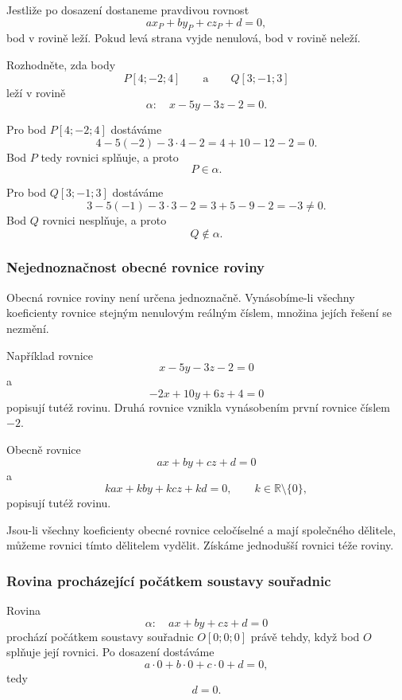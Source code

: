 Jestliže po dosazení dostaneme pravdivou rovnost
\[
    ax_P+by_P+cz_P+d=0,
\]
bod v rovině leží. Pokud levá strana vyjde nenulová, bod v rovině neleží.

\begin{example}
    \label{exa:Point_membership_general_plane}
    Rozhodněte, zda body
    \[
        P[4;-2;4]
        \qquad\text{a}\qquad
        Q[3;-1;3]
    \]
    leží v rovině
    \[
        \alpha:\quad x-5y-3z-2=0.
    \]

    Pro bod $P[4;-2;4]$ dostáváme
    \[
        4-5(-2)-3\cdot4-2
        =4+10-12-2
        =0.
    \]
    Bod $P$ tedy rovnici splňuje, a proto
    \[
        P\in\alpha.
    \]

    Pro bod $Q[3;-1;3]$ dostáváme
    \[
        3-5(-1)-3\cdot3-2
        =3+5-9-2
        =-3\neq0.
    \]
    Bod $Q$ rovnici nesplňuje, a proto
    \[
        Q\notin\alpha.
    \]
\end{example}

\subsubsection{Nejednoznačnost obecné rovnice roviny}
\label{subsubsec:Nonuniqueness_general_plane_equation}

Obecná rovnice roviny není určena jednoznačně. Vynásobíme-li všechny
koeficienty rovnice stejným nenulovým reálným číslem, množina jejích
řešení se nezmění.

Například rovnice
\[
    x-5y-3z-2=0
\]
a
\[
    -2x+10y+6z+4=0
\]
popisují tutéž rovinu. Druhá rovnice vznikla vynásobením první rovnice
číslem $-2$.

Obecně rovnice
\[
    ax+by+cz+d=0
\]
a
\[
    kax+kby+kcz+kd=0,
    \qquad
    k\in\mathbb{R}\setminus\{0\},
\]
popisují tutéž rovinu.

\begin{remark}
    Jsou-li všechny koeficienty obecné rovnice celočíselné a mají
    společného dělitele, můžeme rovnici tímto dělitelem vydělit. Získáme
    jednodušší rovnici téže roviny.
\end{remark}

\subsubsection{Rovina procházející počátkem soustavy souřadnic}
\label{subsubsec:Plane_through_origin}

Rovina
\[
    \alpha:\quad ax+by+cz+d=0
\]
prochází počátkem soustavy souřadnic $O[0;0;0]$ právě tehdy, když bod
$O$ splňuje její rovnici. Po dosazení dostáváme
\[
    a\cdot0+b\cdot0+c\cdot0+d=0,
\]
tedy
\[
    d=0.
\]

